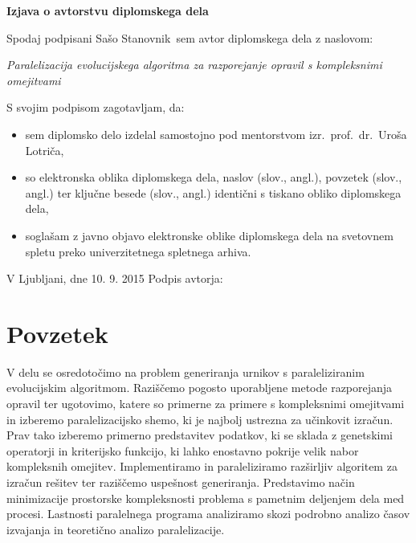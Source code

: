 \documentclass[a4paper,12pt]{book}
\newcommand{\ttitle}{Paralelizacija evolucijskega algoritma za razporejanje opravil s kompleksnimi omejitvami}
\newcommand{\tauthor}{Sašo Stanovnik}
\newcommand{\clearemptydoublepage}{\newpage{\pagestyle{empty}\cleardoublepage}}
\begin{document}
\vspace*{1cm}
\begin{center}
{\Large \textbf{\sc Izjava o avtorstvu diplomskega dela}}
\end{center}

\vspace{1cm}
\noindent Spodaj podpisani \tauthor\ sem avtor  diplomskega dela z naslovom:

\vspace{0.5cm}
\emph{\ttitle}

\vspace{1.5cm}
\noindent S svojim podpisom zagotavljam, da:
\begin{itemize}
	\item sem diplomsko delo izdelal samostojno pod mentorstvom
		izr.\ prof.\ dr.\ Uroša Lotriča,

	\item	so elektronska oblika diplomskega dela, naslov (slov., angl.), povzetek (slov., angl.) ter ključne besede (slov., angl.) identični s tiskano obliko diplomskega dela,
	\item soglašam z javno objavo elektronske oblike diplomskega dela na svetovnem spletu preko univerzitetnega spletnega arhiva.	
\end{itemize}

\vspace{1cm}
\noindent V Ljubljani, dne 10. 9. 2015 \hfill Podpis avtorja:

\clearemptydoublepage








\clearemptydoublepage

\def\thepage{}%
\tableofcontents{}


\clearemptydoublepage

\chapter*{Povzetek}
V delu se osredotočimo na problem generiranja urnikov s paraleliziranim evolucijskim algoritmom. Raziščemo pogosto uporabljene metode razporejanja opravil ter ugotovimo, katere so primerne za primere s kompleksnimi omejitvami in izberemo paralelizacijsko shemo, ki je najbolj ustrezna za učinkovit izračun. Prav tako izberemo primerno predstavitev podatkov, ki se sklada z genetskimi operatorji in kriterijsko funkcijo, ki lahko enostavno pokrije velik nabor kompleksnih omejitev. Implementiramo in paraleliziramo razširljiv algoritem za izračun rešitev ter raziščemo uspešnost generiranja. Predstavimo način minimizacije prostorske kompleksnosti problema s pametnim deljenjem dela med procesi. Lastnosti paralelnega programa analiziramo skozi podrobno analizo časov izvajanja in teoretično analizo paralelizacije. 
\bigskip
\end{document}
